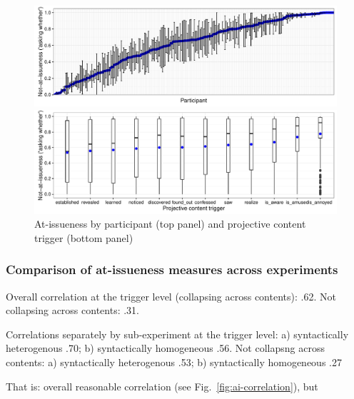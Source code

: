 \documentclass[11pt,fleqn]{article}
\newcommand{\6}{\mbox{$[\hspace*{-.6mm}[$}}
\newcommand{\9}{\mbox{$]\hspace*{-.6mm}]$}}
\newcommand{\figref}[1]{Fig.~\ref{#1}}
\begin{document}
\begin{figure}[!h]
\begin{center}

\includegraphics[width=16cm]{../results/exp2b/graphs/ai-subjectmeans}

\includegraphics[width=16cm]{../results/exp2b/graphs/boxplot-not-at-issueness}

\end{center}
\caption{At-issueness by participant (top panel) and projective content trigger (bottom panel)}
\label{f-ai-2b}
\end{figure}

\subsubsection{Comparison of at-issueness measures across experiments}

Overall correlation at the trigger level (collapsing across contents): .62. Not collapsing across contents: .31.

Correlations separately by sub-experiment at the trigger level: a) syntactically heterogenous .70; b) syntactically homogeneous .56. Not collapsng across contents:  a) syntactically heterogenous .53; b) syntactically homogeneous .27

That is: overall reasonable correlation (see \figref{fig:ai-correlation}), but 
\end{document}
